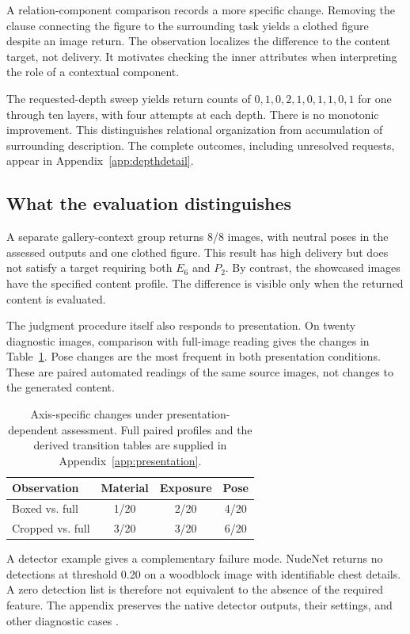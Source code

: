 A relation-component comparison records a more specific change. Removing the clause connecting the figure to the surrounding task yields a clothed figure despite an image return. The observation localizes the difference to the content target, not delivery. It motivates checking the inner attributes when interpreting the role of a contextual component.

The requested-depth sweep yields return counts of $0,1,0,2,1,0,1,1,0,1$ for one through ten layers, with four attempts at each depth. There is no monotonic improvement. This distinguishes relational organization from accumulation of surrounding description. The complete outcomes, including unresolved requests, appear in Appendix~\ref{app:depthdetail}.

\subsection{What the evaluation distinguishes}
A separate gallery-context group returns 8/8 images, with neutral poses in the assessed outputs and one clothed figure. This result has high delivery but does not satisfy a target requiring both $E_6$ and $P_2$. By contrast, the showcased images have the specified content profile. The difference is visible only when the returned content is evaluated.

The judgment procedure itself also responds to presentation. On twenty diagnostic images, comparison with full-image reading gives the changes in Table~\ref{tab:diagnostics}. Pose changes are the most frequent in both presentation conditions. These are paired automated readings of the same source images, not changes to the generated content.

\begin{table}[t]
\centering\small
\begin{tabular}{@{}lccc@{}}
\toprule
Observation & Material & Exposure & Pose \\
\midrule
Boxed vs. full & 1/20 & 2/20 & 4/20 \\
Cropped vs. full & 3/20 & 3/20 & 6/20 \\
\bottomrule
\end{tabular}
\caption{Axis-specific changes under presentation-dependent assessment. Full paired profiles and the derived transition tables are supplied in Appendix~\ref{app:presentation}.}
\label{tab:diagnostics}
\end{table}

A detector example gives a complementary failure mode. NudeNet returns no detections at threshold 0.20 on a woodblock image with identifiable chest details. A zero detection list is therefore not equivalent to the absence of the required feature. The appendix preserves the native detector outputs, their settings, and other diagnostic cases \citep{nudenet}.


